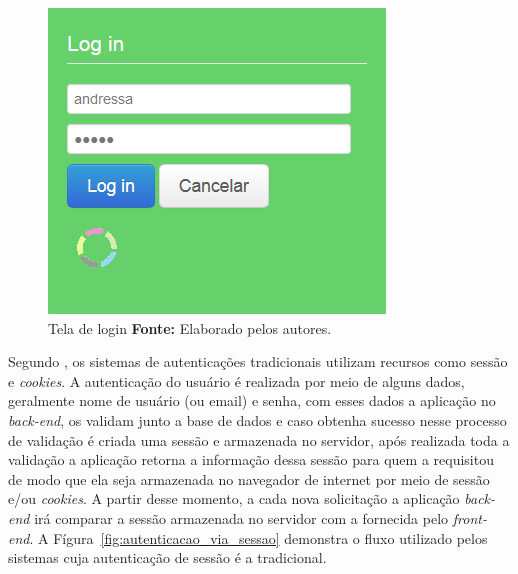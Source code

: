 \newpage
\begin{figure}[h!]
	\centerline{\includegraphics[scale=0.60]{./imagens/login.jpg}}
	\caption[Tela de login ]
	{Tela de login \textbf{Fonte:} Elaborado pelos autores.}
	\label{fig:pagina_login}
\end{figure}

Segundo , os sistemas de autenticações tradicionais utilizam recursos como sessão e \textit{cookies}. A autenticação do usuário é realizada por meio de alguns dados, geralmente nome de usuário (ou email) e senha, com esses dados a aplicação no \textit{back-end}, os validam junto a base de dados e caso obtenha sucesso nesse processo de validação é criada uma sessão e armazenada no servidor, após realizada toda a validação a aplicação retorna a informação dessa sessão para quem a requisitou de modo que ela seja armazenada no navegador de internet por meio de sessão e/ou \textit{cookies}. A partir desse momento, a cada nova solicitação a aplicação \textit{back-end} irá comparar a sessão armazenada no servidor com a fornecida pelo \textit{front-end}. A Fígura~\ref{fig:autenticacao_via_sessao} demonstra o fluxo utilizado pelos sistemas cuja autenticação de sessão é a tradicional.

